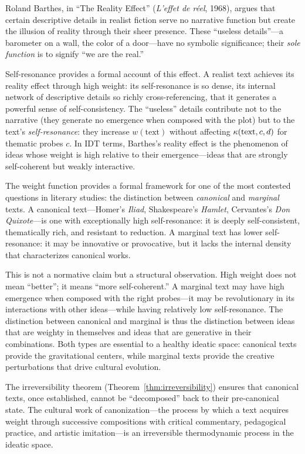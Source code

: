\begin{interpretation}\label{interp:ch3:barthes_reality_effect}
Roland Barthes, in ``The Reality Effect'' (\emph{L'effet de r\'eel}, 1968),
argues that certain descriptive details in realist fiction serve no
narrative function but create the illusion of reality through their sheer
presence. These ``useless details''---a barometer on a wall, the color
of a door---have no symbolic significance; their \emph{sole function} is
to signify ``we are the real.''

Self-resonance provides a formal account of this effect. A realist text
achieves its reality effect through high weight: its self-resonance is so
dense, its internal network of descriptive details so richly
cross-referencing, that it generates a powerful sense of self-consistency.
The ``useless'' details contribute not to the narrative (they generate
no emergence when composed with the plot) but to the text's
\emph{self-resonance}: they increase $w(\text{text})$ without affecting
$\kappa(\text{text}, c, d)$ for thematic probes $c$. In IDT terms,
Barthes's reality effect is the phenomenon of ideas whose weight is high
relative to their emergence---ideas that are strongly self-coherent but
weakly interactive.
\end{interpretation}

\begin{interpretation}\label{interp:ch3:canonical_marginal}
The weight function provides a formal framework for one of the most
contested questions in literary studies: the distinction between
\emph{canonical} and \emph{marginal} texts. A canonical text---Homer's
\emph{Iliad}, Shakespeare's \emph{Hamlet}, Cervantes's \emph{Don
Quixote}---is one with exceptionally high self-resonance: it is deeply
self-consistent, thematically rich, and resistant to reduction. A marginal
text has lower self-resonance: it may be innovative or provocative, but it
lacks the internal density that characterizes canonical works.

This is not a normative claim but a structural observation. High weight
does not mean ``better''; it means ``more self-coherent.'' A marginal text
may have high emergence when composed with the right probes---it may be
revolutionary in its interactions with other ideas---while having
relatively low self-resonance. The distinction between canonical and
marginal is thus the distinction between ideas that are weighty in
themselves and ideas that are generative in their combinations. Both types
are essential to a healthy ideatic space: canonical texts provide the
gravitational centers, while marginal texts provide the creative
perturbations that drive cultural evolution.

The irreversibility theorem (Theorem~\ref{thm:irreversibility}) ensures
that canonical texts, once established, cannot be ``decomposed'' back to
their pre-canonical state. The cultural work of canonization---the process
by which a text acquires weight through successive compositions with
critical commentary, pedagogical practice, and artistic imitation---is an
irreversible thermodynamic process in the ideatic space.
\end{interpretation}

